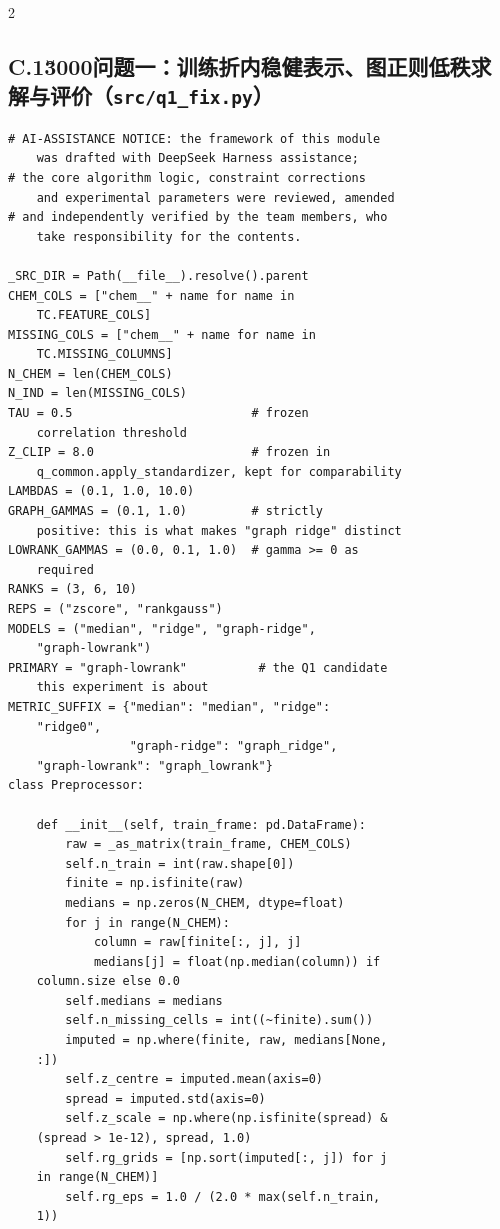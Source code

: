 \begin{multicols}{2}
\subsection*{C.1\u3000问题一：训练折内稳健表示、图正则低秩求解与评价（\texttt{src/q1\_fix.py}）}
\begin{Verbatim}[fontsize=\scriptsize]
# AI-ASSISTANCE NOTICE: the framework of this module
    was drafted with DeepSeek Harness assistance;
# the core algorithm logic, constraint corrections
    and experimental parameters were reviewed, amended
# and independently verified by the team members, who
    take responsibility for the contents.

_SRC_DIR = Path(__file__).resolve().parent
CHEM_COLS = ["chem__" + name for name in
    TC.FEATURE_COLS]
MISSING_COLS = ["chem__" + name for name in
    TC.MISSING_COLUMNS]
N_CHEM = len(CHEM_COLS)
N_IND = len(MISSING_COLS)
TAU = 0.5                         # frozen
    correlation threshold
Z_CLIP = 8.0                      # frozen in
    q_common.apply_standardizer, kept for comparability
LAMBDAS = (0.1, 1.0, 10.0)
GRAPH_GAMMAS = (0.1, 1.0)         # strictly
    positive: this is what makes "graph ridge" distinct
LOWRANK_GAMMAS = (0.0, 0.1, 1.0)  # gamma >= 0 as
    required
RANKS = (3, 6, 10)
REPS = ("zscore", "rankgauss")
MODELS = ("median", "ridge", "graph-ridge",
    "graph-lowrank")
PRIMARY = "graph-lowrank"          # the Q1 candidate
    this experiment is about
METRIC_SUFFIX = {"median": "median", "ridge":
    "ridge0",
                 "graph-ridge": "graph_ridge",
    "graph-lowrank": "graph_lowrank"}
class Preprocessor:

    def __init__(self, train_frame: pd.DataFrame):
        raw = _as_matrix(train_frame, CHEM_COLS)
        self.n_train = int(raw.shape[0])
        finite = np.isfinite(raw)
        medians = np.zeros(N_CHEM, dtype=float)
        for j in range(N_CHEM):
            column = raw[finite[:, j], j]
            medians[j] = float(np.median(column)) if
    column.size else 0.0
        self.medians = medians
        self.n_missing_cells = int((~finite).sum())
        imputed = np.where(finite, raw, medians[None,
    :])
        self.z_centre = imputed.mean(axis=0)
        spread = imputed.std(axis=0)
        self.z_scale = np.where(np.isfinite(spread) &
    (spread > 1e-12), spread, 1.0)
        self.rg_grids = [np.sort(imputed[:, j]) for j
    in range(N_CHEM)]
        self.rg_eps = 1.0 / (2.0 * max(self.n_train,
    1))


\end{Verbatim}
\end{multicols}
